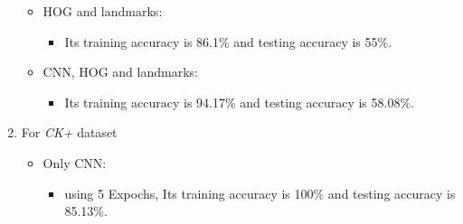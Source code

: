 \begin{enumerate}
\begin{itemize}
    \item HOG and landmarks: 
        \begin{itemize}
            \item Its training accuracy is 86.1\% and testing accuracy is 55\%.
        \end{itemize}
    \item CNN, HOG and landmarks: 
        \begin{itemize}
            \item Its training accuracy is 94.17\% and testing accuracy is 58.08\%.
        \end{itemize}
\end{itemize}
\item For \textit{CK+} dataset \newline
\begin{itemize}
    \item Only CNN: 
        \begin{itemize}
            \item using 5 Expochs, Its training accuracy is 100\% and testing accuracy is 85.13\%.
        \end{itemize}

	\begin{comment}
    \item Only HOG: 
        \begin{itemize}
            \item It takes X time in training and X time in testing.
            \item The model size was X.
            \item Its training accuracy is X and testing accuracy is X.
        \end{itemize}
    \item Only landmarks: 
        \begin{itemize}
            \item It takes X time in training and X time in testing.
            \item The model size was X.
            \item Its training accuracy is X and testing accuracy is X.
        \end{itemize}
	\end{comment}


\end{itemize}
\end{enumerate}
